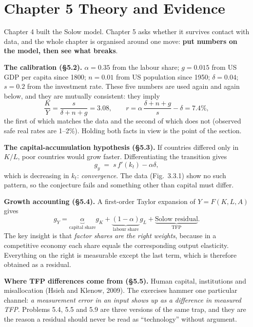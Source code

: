 \documentclass[12pt, letterpaper]{article}
\begin{document}
\tableofcontents
\newpage

\section{Chapter 5 \quad Theory and Evidence}

\begin{tcolorbox}[theorybox,title={Chapter 5 Overview}]
Chapter 4 built the Solow model. Chapter 5 asks whether it survives contact with data, and
the whole chapter is organised around one move: \textbf{put numbers on the model, then see
what breaks}.

\smallskip
\textbf{The calibration (\S5.2).} $\alpha=0.35$ from the labour share; $g=0.015$ from US GDP
per capita since 1800; $n=0.01$ from US population since 1950; $\delta=0.04$; $s=0.2$ from
the investment rate. These five numbers are used again and again below, and they are
mutually consistent: they imply
\[
\frac{K}{Y}=\frac{s}{\delta+n+g}=3.08,
\qquad
r=\alpha\,\frac{\delta+n+g}{s}-\delta=7.4\%,
\]
the first of which matches the data and the second of which does not (observed safe real
rates are 1--2\%). Holding both facts in view is the point of the section.

\smallskip
\textbf{The capital-accumulation hypothesis (\S5.3).} If countries differed only in $K/L$,
poor countries would grow faster. Differentiating the transition gives
\[
g_y \;=\; s\,f'(k_t)-\alpha\delta,
\tag{5.3.1}
\]
which is decreasing in $k_t$: \emph{convergence}. The data (Fig.~3.3.1) show no such
pattern, so the conjecture fails and something other than capital must differ.

\smallskip
\textbf{Growth accounting (\S5.4).} A first-order Taylor expansion of $Y=F(K,L,A)$ gives
\[
g_Y=\underbrace{\alpha}_{\text{capital share}}g_K
   +\underbrace{(1-\alpha)}_{\text{labour share}}g_L
   +\underbrace{\text{Solow residual}}_{\text{TFP}} .
\tag{5.4.2}
\]
The key insight is that \emph{factor shares are the right weights}, because in a competitive
economy each share equals the corresponding output elasticity. Everything on the right is
measurable except the last term, which is therefore obtained as a residual.

\smallskip
\textbf{Where TFP differences come from (\S5.5).} Human capital, institutions and
misallocation (Hsieh and Klenow, 2009). The exercises hammer one particular channel:
\emph{a measurement error in an input shows up as a difference in measured TFP}. Problems
5.4, 5.5 and 5.9 are three versions of the same trap, and they are the reason a residual
should never be read as ``technology'' without argument.
\end{tcolorbox}
\end{document}
